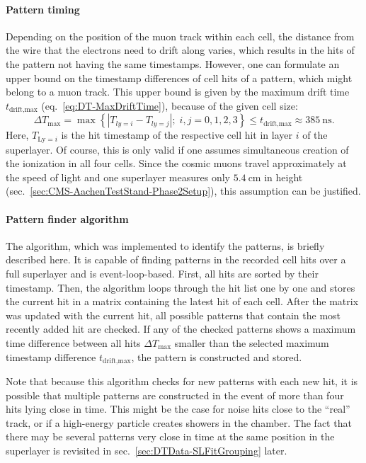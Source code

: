 \paragraph{Pattern timing}
Depending on the position of the muon track within each cell, the distance from the wire that the electrons need to drift along varies, which results in the hits of the pattern not having the same timestamps. However, one can formulate an upper bound on the timestamp differences of cell hits of a pattern, which might belong to a muon track. This upper bound is given by the maximum drift time $t_\text{drift,max}$ (eq.\ \ref{eq:DT-MaxDriftTime}), because of the given cell size:
\begin{equation}
    \Delta T_\text{max} = \max \left\{ \left | T_{ly=i} - T_{ly=j} \right | ; \; i,j=0,1,2,3 \right\} \leq t_\text{drift,max} \approx \SI{385}{\nano\second}.
    \label{eq:DTData-PatternTimeWindow}
\end{equation}
Here, $T_{\text{Ly}=i}$ is the hit timestamp of the respective cell hit in layer $i$ of the superlayer. Of course, this is only valid if one assumes simultaneous creation of the ionization in all four cells. Since the cosmic muons travel approximately at the speed of light and one superlayer measures only $\SI{5.4}{\centi\meter}$ in height (sec.\ \ref{sec:CMS-AachenTestStand-Phase2Setup}), this assumption can be justified.
\paragraph{Pattern finder algorithm}
The algorithm, which was implemented to identify the patterns, is briefly described here. It is capable of finding patterns in the recorded cell hits over a full superlayer and is event-loop-based. First, all hits are sorted by their timestamp. Then, the algorithm loops through the hit list one by one and stores the current hit in a matrix containing the latest hit of each cell. After the matrix was updated with the current hit, all possible patterns that contain the most recently added hit are checked. If any of the checked patterns shows a maximum time difference between all hits $\Delta T_\text{max}$ smaller than the selected maximum timestamp difference $t_\text{drift,max}$, the pattern is constructed and stored.
\par Note that because this algorithm checks for new patterns with each new hit, it is possible that multiple patterns are constructed in the event of more than four hits lying close in time. This might be the case for noise hits close to the \enquote{real} track, or if a high-energy particle creates showers in the chamber. The fact that there may be several patterns very close in time at the same position in the superlayer is revisited in sec.\ \ref{sec:DTData-SLFitGrouping} later.
